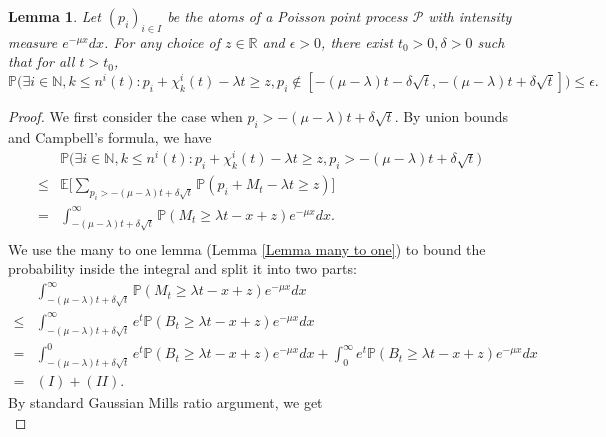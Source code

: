 \documentclass[a4paper,reqno]{amsart}%
\newcommand{\1}{\mathbf 1}
\theoremstyle{mine}
\numberwithin{theorem}{section}
\newtheorem{lemma}[theorem]{Lemma}
\numberwithin{equation}{section}
\theoremstyle{remark}
\begin{document}
\begin{lemma}\label{Main_contribution in sec3}
  Let $(p_{i})_{i\in I}$ be the atoms of a Poisson point process $\mathcal P$ with intensity measure $e^{-\mu x}dx$. For any choice of $z\in \mathbb R$ and $\epsilon>0$, there exist $t_{0}>0, \delta >0$ such that for all $t > t_{0}$, 
  \begin{equation}
    \mathbb{P} \biggl(\exists i\in \mathbb N, k \le n^{i}(t):p_{i}+\chi_k^i(t)-\lambda t \ge z,p_i\notin[-(\mu - \lambda)t-\delta\sqrt{t},-(\mu -\lambda)t+\delta\sqrt{t}]\biggr)\le \epsilon. \label{2.18}
  \end{equation}
\end{lemma}
\begin{proof}
  We first consider the case when $p_{i}> -(\mu -\lambda)t+\delta\sqrt{t}$.
  By union bounds and Campbell's formula, we have 
  \begin{equation}\label{estimae in Lem3.2}
    \begin{aligned}
       &\mathbb{P} \biggl(\exists i\in \mathbb N, k \le n^{i}(t):p_{i}+\chi_k^i(t)-\lambda t \ge z, p_i>-(\mu -\lambda)t+\delta\sqrt{t} \biggr)\\
     \le&\mathbb{E} \biggl[\sum_{p_{i} > -(\mu - \lambda)t +\delta \sqrt{t}}\mathbb{P} (p_{i}+M_{t}-\lambda t \ge z)\biggr]\\
      =&\int_{-(\mu-\lambda)t+\delta\sqrt{t}}^{\infty}\mathbb{P} (M_{t}\ge \lambda t-x+z)e^{-\mu x}dx.\\
    \end{aligned}
  \end{equation}
We use the many to one lemma  (Lemma \ref{Lemma many to one}) to bound the probability inside the integral and split it into two parts:
\begin{equation}
    \begin{aligned}
    &\int_{-(\mu-\lambda)t+\delta\sqrt{t}}^{\infty}\mathbb{P} (M_{t}\ge \lambda t-x+z)e^{-\mu x}dx\\
           \le&\int_{-(\mu-\lambda)t+\delta\sqrt{t}}^{\infty}e^{t}\mathbb{P}(B_{t}\ge \lambda t-x+z)e^{-\mu x}dx \\
    = &\int_{-(\mu-\lambda)t+\delta\sqrt{t}}^{0}e^{t}\mathbb{P}(B_{t}\ge \lambda t-x+z)e^{-\mu x}dx + \int_{0}^{\infty}e^{t}\mathbb{P}(B_{t}\ge \lambda t-x+z)e^{-\mu x}dx\\
     = &(I) + (II). \label{2.19}
    \end{aligned}
\end{equation}
By standard Gaussian Mills ratio argument, we get
  \begin{equation}

\end{equation}
\end{proof}
\end{document}
